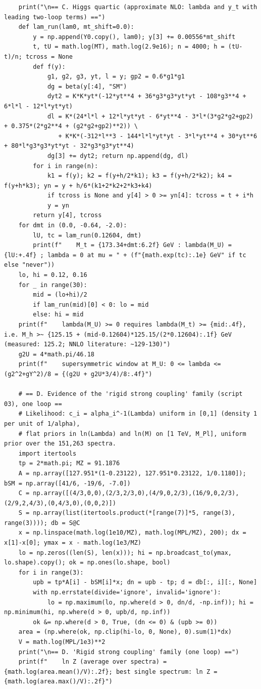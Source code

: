 \documentclass[11pt,a4paper]{article}
\begin{document}
\begin{lstlisting}
    print("\n== C. Higgs quartic (approximate NLO: lambda and y_t with leading two-loop terms) ==")
    def lam_run(lam0, mt_shift=0.0):
        y = np.append(Y0.copy(), lam0); y[3] += 0.00556*mt_shift
        t, tU = math.log(MT), math.log(2.9e16); n = 4000; h = (tU-t)/n; tcross = None
        def f(y):
            g1, g2, g3, yt, l = y; gp2 = 0.6*g1*g1
            dg = beta(y[:4], "SM")
            dyt2 = K*K*yt*(-12*yt**4 + 36*g3*g3*yt*yt - 108*g3**4 + 6*l*l - 12*l*yt*yt)
            dl = K*(24*l*l + 12*l*yt*yt - 6*yt**4 - 3*l*(3*g2*g2+gp2) + 0.375*(2*g2**4 + (g2*g2+gp2)**2)) \
               + K*K*(-312*l**3 - 144*l*l*yt*yt - 3*l*yt**4 + 30*yt**6 + 80*l*g3*g3*yt*yt - 32*g3*g3*yt**4)
            dg[3] += dyt2; return np.append(dg, dl)
        for i in range(n):
            k1 = f(y); k2 = f(y+h/2*k1); k3 = f(y+h/2*k2); k4 = f(y+h*k3); yn = y + h/6*(k1+2*k2+2*k3+k4)
            if tcross is None and y[4] > 0 >= yn[4]: tcross = t + i*h
            y = yn
        return y[4], tcross
    for dmt in (0.0, -0.64, -2.0):
        lU, tc = lam_run(0.12604, dmt)
        print(f"    M_t = {173.34+dmt:6.2f} GeV : lambda(M_U) = {lU:+.4f} ; lambda = 0 at mu = " + (f"{math.exp(tc):.1e} GeV" if tc else "never"))
    lo, hi = 0.12, 0.16
    for _ in range(30):
        mid = (lo+hi)/2
        if lam_run(mid)[0] < 0: lo = mid
        else: hi = mid
    print(f"    lambda(M_U) >= 0 requires lambda(M_t) >= {mid:.4f}, i.e. M_h >~ {125.15 + (mid-0.12604)*125.15/(2*0.12604):.1f} GeV  (measured: 125.2; NNLO literature: ~129-130)")
    g2U = 4*math.pi/46.18
    print(f"    supersymmetric window at M_U: 0 <= lambda <= (g2^2+gY^2)/8 = {(g2U + g2U*3/4)/8:.4f}")

    # == D. Evidence of the 'rigid strong coupling' family (script 03), one loop ==
    # Likelihood: c_i = alpha_i^-1(Lambda) uniform in [0,1] (density 1 per unit of 1/alpha),
    # flat priors in ln(Lambda) and ln(M) on [1 TeV, M_Pl], uniform prior over the 151,263 spectra.
    import itertools
    tp = 2*math.pi; MZ = 91.1876
    A = np.array([127.951*(1-0.23122), 127.951*0.23122, 1/0.1180]); bSM = np.array([41/6, -19/6, -7.0])
    C = np.array([(4/3,0,0),(2/3,2/3,0),(4/9,0,2/3),(16/9,0,2/3),(2/9,2,4/3),(0,4/3,0),(0,0,2)])
    S = np.array(list(itertools.product(*[range(7)]*5, range(3), range(3)))); db = S@C
    x = np.linspace(math.log(1e10/MZ), math.log(MPL/MZ), 200); dx = x[1]-x[0]; ymax = x - math.log(1e3/MZ)
    lo = np.zeros((len(S), len(x))); hi = np.broadcast_to(ymax, lo.shape).copy(); ok = np.ones(lo.shape, bool)
    for i in range(3):
        upb = tp*A[i] - bSM[i]*x; dn = upb - tp; d = db[:, i][:, None]
        with np.errstate(divide='ignore', invalid='ignore'):
            lo = np.maximum(lo, np.where(d > 0, dn/d, -np.inf)); hi = np.minimum(hi, np.where(d > 0, upb/d, np.inf))
        ok &= np.where(d > 0, True, (dn <= 0) & (upb >= 0))
    area = (np.where(ok, np.clip(hi-lo, 0, None), 0).sum(1)*dx)
    V = math.log(MPL/1e3)**2
    print("\n== D. 'Rigid strong coupling' family (one loop) ==")
    print(f"    ln Z (average over spectra) = {math.log(area.mean()/V):.2f}; best single spectrum: ln Z = {math.log(area.max()/V):.2f}")
\end{lstlisting}
\end{document}
